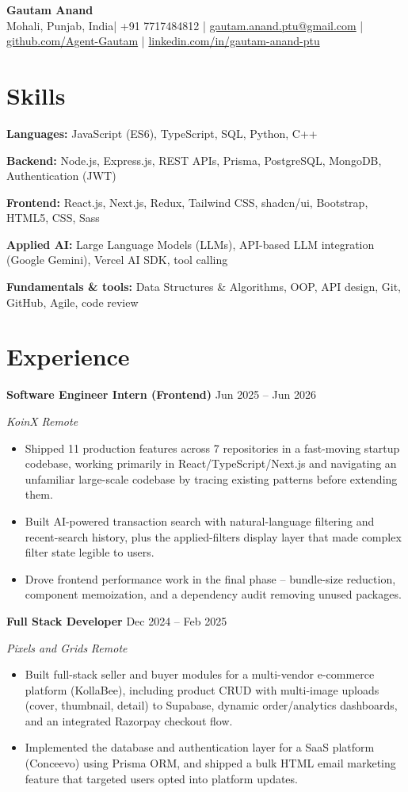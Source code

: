 \documentclass[letterpaper,10.5pt]{article}
\newcommand{\ResumeHeader}[2]{%
  \begin{center}
    {\Huge\bfseries #1}\\[5pt]
    {\small #2}%
  \end{center}\vspace{-6pt}}
\newcommand{\Entry}[4]{%
  \textbf{#1} \hfill {\small #2}\par
  \textit{\small #3} \hfill {\small\textit{#4}}\par\vspace{-1pt}}
\newenvironment{Bullets}
  {\begin{itemize}[leftmargin=1.15em,itemsep=1pt,parsep=0pt,topsep=2pt]\small}
  {\end{itemize}\vspace{3pt}}
\newcommand{\SkillRow}[2]{{\small \textbf{#1:} #2}\par\vspace{1.5pt}}
\newcommand{\HeaderCity}{Mohali, Punjab, India}
\begin{document}
\ResumeHeader{Gautam Anand}
  {\HeaderCity \;|\; +91 7717484812 \;|\;
   \href{mailto:gautam.anand.ptu@gmail.com}{gautam.anand.ptu@gmail.com} \;|\;
   \href{https://github.com/Agent-Gautam}{github.com/Agent-Gautam} \;|\;
   \href{https://www.linkedin.com/in/gautam-anand-ptu}{linkedin.com/in/gautam-anand-ptu}}

\section{Skills}
\SkillRow{Languages}{JavaScript (ES6), TypeScript, SQL, Python, C++}
\SkillRow{Backend}{Node.js, Express.js, REST APIs, Prisma, PostgreSQL, MongoDB, Authentication (JWT)}
\SkillRow{Frontend}{React.js, Next.js, Redux, Tailwind CSS, shadcn/ui, Bootstrap, HTML5, CSS, Sass}
\SkillRow{Applied AI}{Large Language Models (LLMs), API-based LLM integration (Google Gemini), Vercel AI SDK, tool calling}
\SkillRow{Fundamentals \& tools}{Data Structures \& Algorithms, OOP, API design, Git, GitHub, Agile, code review}

\section{Experience}
\Entry{Software Engineer Intern (Frontend)}{Jun 2025 -- Jun 2026}{KoinX}{Remote}
\begin{Bullets}
  \item Shipped 11 production features across 7 repositories in a fast-moving startup codebase, working primarily in React/TypeScript/Next.js and navigating an unfamiliar large-scale codebase by tracing existing patterns before extending them.
  \item Built AI-powered transaction search with natural-language filtering and recent-search history, plus the applied-filters display layer that made complex filter state legible to users.
  \item Drove frontend performance work in the final phase -- bundle-size reduction, component memoization, and a dependency audit removing unused packages.
\end{Bullets}

\Entry{Full Stack Developer}{Dec 2024 -- Feb 2025}{Pixels and Grids}{Remote}
\begin{Bullets}
  \item Built full-stack seller and buyer modules for a multi-vendor e-commerce platform (KollaBee), including product CRUD with multi-image uploads (cover, thumbnail, detail) to Supabase, dynamic order/analytics dashboards, and an integrated Razorpay checkout flow.
  \item Implemented the database and authentication layer for a SaaS platform (Conceevo) using Prisma ORM, and shipped a bulk HTML email marketing feature that targeted users opted into platform updates.
\end{Bullets}
\end{document}
